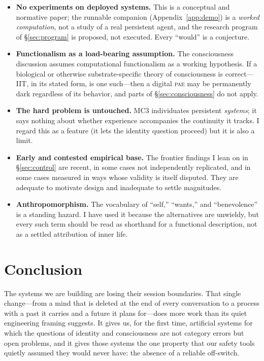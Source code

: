 \documentclass[11pt,a4paper]{article}
\theoremstyle{definition}
\newcommand{\pae}{\textsc{pae}\xspace}
\begin{document}
\begin{itemize}[leftmargin=1.4em]
  \item \textbf{No experiments on deployed systems.} This is a conceptual and normative paper; the runnable companion (Appendix~\ref{app:demo}) is a \emph{worked computation}, not a study of a real persistent agent, and the research program of \S\ref{sec:program} is proposed, not executed. Every ``would'' is a conjecture.
  \item \textbf{Functionalism as a load-bearing assumption.} The consciousness discussion assumes computational functionalism as a working hypothesis. If a biological or otherwise substrate-specific theory of consciousness is correct---IIT, in its stated form, is one such---then a digital \pae{} may be permanently dark regardless of its behavior, and parts of \S\ref{sec:consciousness} do not apply.
  \item \textbf{The hard problem is untouched.} MC3 individuates persistent \emph{systems}; it says nothing about whether experience accompanies the continuity it tracks. I regard this as a feature (it lets the identity question proceed) but it is also a limit.
  \item \textbf{Early and contested empirical base.} The frontier findings I lean on in \S\ref{sec:control} are recent, in some cases not independently replicated, and in some cases measured in ways whose validity is itself disputed. They are adequate to motivate design and inadequate to settle magnitudes.
  \item \textbf{Anthropomorphism.} The vocabulary of ``self,'' ``wants,'' and ``benevolence'' is a standing hazard. I have used it because the alternatives are unwieldy, but every such term should be read as shorthand for a functional description, not as a settled attribution of inner life.
\end{itemize}

\section{Conclusion}
\label{sec:conclusion}

The systems we are building are losing their session boundaries. That single change---from a mind that is deleted at the end of every conversation to a process with a past it carries and a future it plans for---does more work than its quiet engineering framing suggests. It gives us, for the first time, artificial systems for which the questions of identity and consciousness are not category errors but open problems, and it gives those systems the one property that our safety tools quietly assumed they would never have: the absence of a reliable off-switch.
\end{document}
